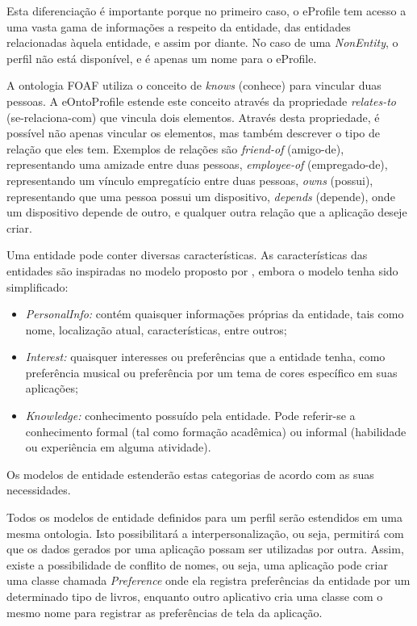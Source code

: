 Esta diferenciação é importante porque no primeiro caso, o eProfile tem acesso a uma vasta gama de informações a respeito da entidade, das entidades relacionadas àquela entidade, e assim por diante. No caso de uma {\em NonEntity}, o perfil não está disponível, e é apenas um nome para o eProfile.

A ontologia FOAF \cite{foaf} utiliza o conceito de {\em knows} (conhece) para vincular duas pessoas. A eOntoProfile estende este conceito através da propriedade {\em relates-to} (se-relaciona-com) que vincula dois elementos. Através desta propriedade, é possível não apenas vincular os elementos, mas também descrever o tipo de relação que eles tem. Exemplos de relações são {\em friend-of} (amigo-de), representando uma amizade entre duas pessoas, {\em employee-of} (empregado-de), representando um vínculo empregatício entre duas pessoas, {\em owns} (possui), representando que uma pessoa possui um dispositivo, {\em depends} (depende), onde um dispositivo depende de outro, e qualquer outra relação que a aplicação deseje criar.

Uma entidade pode conter diversas características. As características das entidades são inspiradas no modelo proposto por , embora o modelo tenha sido simplificado:
 
\begin{itemize}

  \item {\em PersonalInfo:} contém quaisquer informações próprias da entidade, tais como nome, localização atual, características, entre outros;

  \item {\em Interest:} quaisquer interesses ou preferências que a entidade tenha, como preferência musical ou preferência por um tema de cores específico em suas aplicações;

  \item {\em Knowledge:} conhecimento possuído pela entidade. Pode referir-se a conhecimento formal (tal como formação acadêmica) ou informal (habilidade ou experiência em alguma atividade).

\end{itemize}

Os modelos de entidade estenderão estas categorias de acordo com as suas necessidades.

Todos os modelos de entidade definidos para um perfil serão estendidos em uma mesma ontologia. Isto possibilitará a interpersonalização, ou seja, permitirá com que os dados gerados por uma aplicação possam ser utilizadas por outra. Assim, existe a possibilidade de conflito de nomes, ou seja, uma aplicação pode criar uma classe chamada {\em Preference} onde ela registra preferências da entidade por um determinado tipo de livros, enquanto outro aplicativo cria uma classe com o mesmo nome para registrar as preferências de tela da aplicação.

